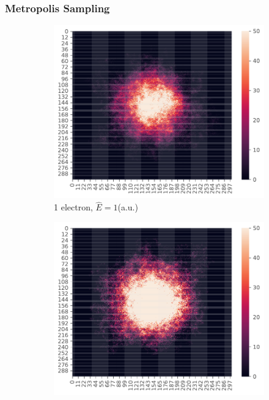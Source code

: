 \documentclass[11pt,a4paper,titlepage]{article}
\begin{document}
\subsubsection{Metropolis Sampling}
\begin{figure}[H]
\begin{subfigure}[t]{.5\textwidth}
\centering
\includegraphics[trim=0cm 0.0cm 0cm 0cm,scale = 0.6]{D2_P_1I_N_Metropolis_S_2pow19_eqS_2pow18_Position_sampling_P_1_NH_2_I_0.pdf}
\caption{1 electron, $\hat E = 1$(a.u.)}
\label{J1}
\end{subfigure}
\begin{subfigure}[t]{.5\textwidth}
\centering
\includegraphics[trim=0cm 0.0cm 0cm 0.0cm,scale = 0.6]{D2_P_2I_N_Metropolis_S_2pow19_eqS_2pow18_Position_sampling_P_2_NH_2_I_0.pdf}

\end{subfigure}
\end{figure}
\end{document}
